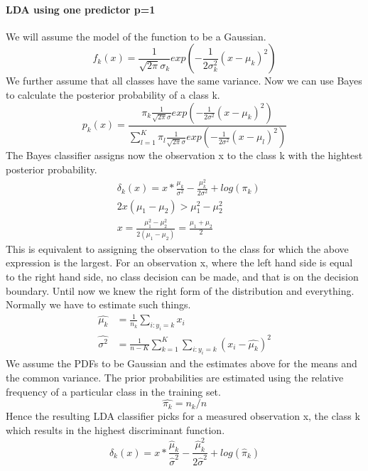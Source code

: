 \documentclass[../document.tex]{subfiles}
\begin{document}
	\paragraph{LDA using one predictor p=1}
	We will assume the model of the function to be a Gaussian.
	\begin{equation}
		f_{k}(x)=\frac{1}{\sqrt{2\pi}\sigma_{k}}exp(-\frac{1}{2\sigma_{k}^2}(x-\mu_{k})^2)
	\end{equation}
	We further assume that all classes have the same variance. Now we can use Bayes to calculate the posterior probability of a class k.
	\begin{equation}
	p_{k}(x)=\frac{\pi_{k}\frac{1}{\sqrt{2\pi}\sigma}exp(-\frac{1}{2\sigma^2}(x-\mu_{k})^2)}{\sum_{l=1}^{K}\pi_{l}\frac{1}{\sqrt{2\pi}\sigma}exp(-\frac{1}{2\sigma^2}(x-\mu_{l})^2)}
	\end{equation}
	The Bayes classifier assigns now the observation x to the class k with the hightest posterior probability.
	\begin{equation}
	\begin{split}
		&\delta_{k}(x)=x*\frac{\mu_{k}}{\sigma^2}-\frac{\mu_{k}^2}{2\sigma^2}+log(\pi_{k})\\
		&2x(\mu_{1}-\mu_{2})>\mu_{1}^2-\mu_{2}^2\\
		&x=\frac{\mu_{1}^2-\mu_{2}^2}{2(\mu_{1}-\mu_{2})}=\frac{\mu_{1}+\mu_{2}}{2}
	\end{split}
	\end{equation}
	This is equivalent to assigning the observation to the class for which the above expression is the largest.
	For an observation x, where the left hand side is equal to the right hand side, no class decision can be made, and that is on the decision boundary. Until now we knew the right form of the distribution and everything. Normally we have to estimate such things.
	\begin{equation}
	\begin{split}
		\hat{\mu_{k}}&=\frac{1}{n_{k}}\sum_{i:y_{i}=k}x_{i}\\
		\hat{\sigma^2}&=\frac{1}{n-K}\sum_{k=1}^{K}\sum_{i:y_{i}=k}(x_{i}-\hat{\mu_{k}})^2
	\end{split}
	\end{equation}
	We assume the PDFs to be Gaussian and the estimates above for the means and the common variance. The prior probabilities are estimated using the relative frequency of a particular class in the training set.
	\begin{equation}
		\hat{\pi_{k}}=n_{k}/n
	\end{equation}
	Hence the resulting LDA classifier picks for a measured observation x, the class k which results in the highest discriminant function.
	\begin{equation}
		\hat{\delta}_{k}(x)=x*\frac{\hat{\mu}_{k}}{\hat{\sigma}^2}-\frac{\hat{\mu}_{k}^2}{2\hat{\sigma}^2}+log(\hat{\pi}_{k})
	\end{equation}
\end{document}
